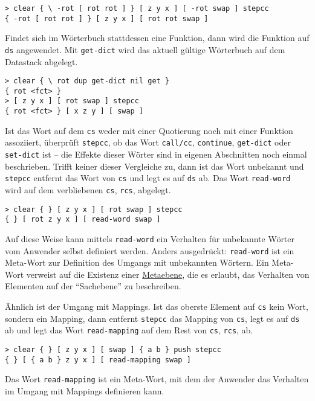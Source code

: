 \begin{verbatim}
> clear { \ -rot [ rot rot ] } [ z y x ] [ -rot swap ] stepcc
{ -rot [ rot rot ] } [ z y x ] [ rot rot swap ]
\end{verbatim}

Findet sich im Wörterbuch stattdessen eine Funktion, dann wird die Funktion auf \verb|ds| angewendet. Mit \verb|get-dict| wird das aktuell gültige Wörterbuch auf dem Datastack abgelegt.

\begin{verbatim}
> clear { \ rot dup get-dict nil get }
{ rot <fct> }
> [ z y x ] [ rot swap ] stepcc
{ rot <fct> } [ x z y ] [ swap ]
\end{verbatim}

Ist das Wort auf dem \verb|cs| weder mit einer Quotierung noch mit einer Funktion assoziiert, überprüft \verb|stepcc|, ob das Wort \verb|call/cc|, \verb|continue|, \verb|get-dict| oder \verb|set-dict| ist -- die Effekte dieser Wörter sind in eigenen Abschnitten noch einmal beschrieben. Trifft keiner dieser Vergleiche zu, dann ist das Wort unbekannt und \verb|stepcc| entfernt das Wort von \verb|cs| und legt es auf \verb|ds| ab. Das Wort \verb|read-word| wird auf dem verbliebenen \verb|cs|, \verb|rcs|, abgelegt.

\begin{verbatim}
> clear { } [ z y x ] [ rot swap ] stepcc
{ } [ rot z y x ] [ read-word swap ]
\end{verbatim}

Auf diese Weise kann mittels \verb|read-word| ein Verhalten für unbekannte Wörter vom Anwender selbst definiert werden. Anders ausgedrückt: \verb|read-word| ist ein Meta-Wort zur Definition des Umgangs mit unbekannten Wörtern. Ein Meta-Wort verweist auf die Existenz einer \href{http://de.wikipedia.org/wiki/Metaebene}{Metaebene}, die es erlaubt, das Verhalten von Elementen auf der "`Sachebene"' zu beschreiben.

Ähnlich ist der Umgang mit Mappings. Ist das oberste Element auf \verb|cs| kein Wort, sondern ein Mapping, dann entfernt \verb|stepcc| das Mapping von \verb|cs|, legt es auf \verb|ds| ab und legt das Wort \verb|read-mapping| auf dem Rest von \verb|cs|, \verb|rcs|, ab.

\begin{verbatim}
> clear { } [ z y x ] [ swap ] { a b } push stepcc
{ } [ { a b } z y x ] [ read-mapping swap ]
\end{verbatim}

Das Wort \verb|read-mapping| ist ein Meta-Wort, mit dem der Anwender das Verhalten im Umgang mit Mappings definieren kann.

